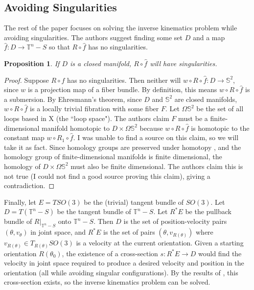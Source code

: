 \documentclass[12pt]{article}
\newtheorem{prop}{Proposition}
\theoremstyle{definition}
\begin{document}
\subsection{Avoiding Singularities}
The rest of the paper focuses on solving the inverse kinematics problem while
avoiding singularities. 
The authors suggest finding some set \(D\) and a map \(\hat{f} : D \rightarrow
\mathbb{T}^n - S\) so that \(R \circ \hat{f}\) has no singularities.

\begin{prop}
    If \(D\) is a closed manifold, \(R \circ \hat{f}\) will have singularities.
\end{prop}
\begin{proof}
    Suppose \(R \circ \hat{f}\) has no singularities. Then neither will 
    \(w \circ R \circ \hat{f} : D \rightarrow \mathbb{S}^2\), since \(w\) is a
    projection map of a fiber bundle. By definition, 
    this means \(w \circ R \circ \hat{f}\) is a submersion.
    By Ehresmann's theorem, since \(D\) and \(\mathbb{S}^2\) are closed
    manifolds, \(w \circ R \circ \hat{f}\) is a locally trivial fibration with
    some fiber \(F\).
    Let \(\Omega\mathbb{S}^2\) be the set of all loops based in X (the ``loop
    space").
    The authors claim \(F\) must be a finite-dimensional manifold homotopic to
    \(D \times \Omega\mathbb{S}^2\) because \(w \circ R \circ \hat{f}\) is
    homotopic to the constant map \(w \circ R_1 \circ \hat{f}\). I was unable to
    find a source on this claim, so we will take it as fact.
    Since homology groups are preserved under homotopy \cite{intro-top-manifolds}, and
    the homology group of finite-dimensional manifolds is finite dimensional, the
    homology of \(D \times \Omega\mathbb{S}^2\) must also be finite
    dimensional. The authors claim this is not true (I could not find
    a good source proving this claim), giving a contradiction.
\end{proof}

Finally, let \(E = TSO(3)\) be the (trivial) tangent
bundle of \(SO(3)\). Let \(D = T(\mathbb{T}^n - S)\) be
the tangent bundle of \(\mathbb{T}^n - S\). 
Let \(R^*E\) be the pullback bundle of \(R|_{\mathbb{T}^n - S}\) onto
\(\mathbb{T}^n - S\).
Then \(D\) is the set of position-velocity pairs
\((\theta, v_\theta)\) in joint space, and \(R^*E\) is the set of pairs
\((\theta, v_{R(\theta)})\) where \(v_{R(\theta)} \in T_{R(\theta)}SO(3)\) 
is a velocity at the current orientation. 
Given a starting orientation \(R(\theta_0)\), the existence of a
cross-section \(s : R^*E \rightarrow D\) would find the velocity in joint space
required to produce a desired velocity and position in the orientation (all while
avoiding singular configurations). By the results of
\cite{robots-fiber-bundles}, this cross-section exists, so the inverse
kinematics problem can be solved.
\end{document}
